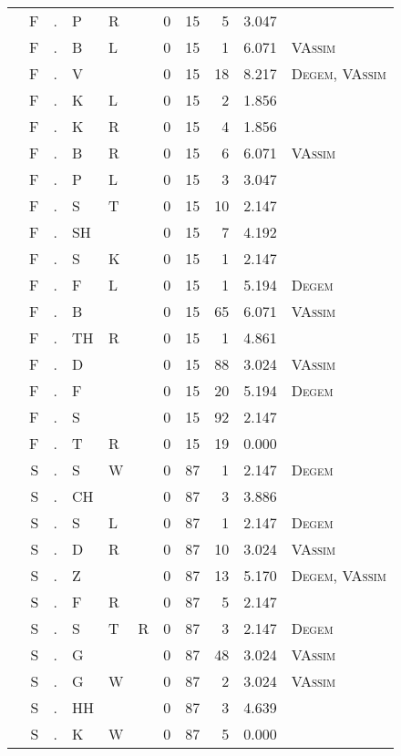 \begin{longtable}{r@{ } r@{ } c@{ } l@{ } l@{ } l@{ } r r r r l }
 & F & . & P & R &  & 0 & 15 & 5 & 3.047 &  \\
 & F & . & B & L &  & 0 & 15 & 1 & 6.071 & \textsc{VAssim} \\
 & F & . & V &  &  & 0 & 15 & 18 & 8.217 & \textsc{Degem}, \textsc{VAssim} \\
 & F & . & K & L &  & 0 & 15 & 2 & 1.856 &  \\
 & F & . & K & R &  & 0 & 15 & 4 & 1.856 &  \\
 & F & . & B & R &  & 0 & 15 & 6 & 6.071 & \textsc{VAssim} \\
 & F & . & P & L &  & 0 & 15 & 3 & 3.047 &  \\
 & F & . & S & T &  & 0 & 15 & 10 & 2.147 &  \\
 & F & . & SH &  &  & 0 & 15 & 7 & 4.192 &  \\
 & F & . & S & K &  & 0 & 15 & 1 & 2.147 &  \\
 & F & . & F & L &  & 0 & 15 & 1 & 5.194 & \textsc{Degem} \\
 & F & . & B &  &  & 0 & 15 & 65 & 6.071 & \textsc{VAssim} \\
 & F & . & TH & R &  & 0 & 15 & 1 & 4.861 &  \\
 & F & . & D &  &  & 0 & 15 & 88 & 3.024 & \textsc{VAssim} \\
 & F & . & F &  &  & 0 & 15 & 20 & 5.194 & \textsc{Degem} \\
 & F & . & S &  &  & 0 & 15 & 92 & 2.147 &  \\
 & F & . & T & R &  & 0 & 15 & 19 & 0.000 &  \\
 & S & . & S & W &  & 0 & 87 & 1 & 2.147 & \textsc{Degem} \\
 & S & . & CH &  &  & 0 & 87 & 3 & 3.886 &  \\
 & S & . & S & L &  & 0 & 87 & 1 & 2.147 & \textsc{Degem} \\
 & S & . & D & R &  & 0 & 87 & 10 & 3.024 & \textsc{VAssim} \\
 & S & . & Z &  &  & 0 & 87 & 13 & 5.170 & \textsc{Degem}, \textsc{VAssim} \\
 & S & . & F & R &  & 0 & 87 & 5 & 2.147 &  \\
 & S & . & S & T & R & 0 & 87 & 3 & 2.147 & \textsc{Degem} \\
 & S & . & G &  &  & 0 & 87 & 48 & 3.024 & \textsc{VAssim} \\
 & S & . & G & W &  & 0 & 87 & 2 & 3.024 & \textsc{VAssim} \\
 & S & . & HH &  &  & 0 & 87 & 3 & 4.639 &  \\
 & S & . & K & W &  & 0 & 87 & 5 & 0.000 &  \\

\end{longtable}

